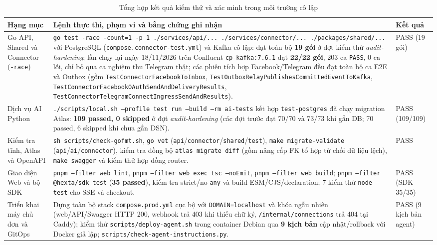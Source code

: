 \begin{table}[htbp]
  \centering
  \footnotesize
  \setlength{\tabcolsep}{4pt}
  \renewcommand{\arraystretch}{1.2}
  \caption{Tổng hợp kết quả kiểm thử và xác minh trong môi trường cô lập}\label{tab:eval-results}
  \begin{tabularx}{\linewidth}{@{}
    >{\raggedright\arraybackslash}p{2.9cm}
    >{\raggedright\arraybackslash}X
    >{\raggedright\arraybackslash}p{2.1cm}@{}}
    \toprule
    Hạng mục & Lệnh thực thi, phạm vi và bằng chứng ghi nhận & Kết quả \\
    \midrule
    Go API, Shared và Connector (\texttt{-race}) &
    \texttt{go test -race -count=1 -p 1 ./services/api/... ./services/connector/... ./packages/shared/...} với PostgreSQL (\texttt{compose.connector-test.yml}) và Kafka cô lập: đạt toàn bộ \textbf{19 gói} ở đợt kiểm thử \textit{audit-hardening}; lần chạy lại ngày 18/11/2026 trên Confluent \texttt{cp-\hspace{0pt}kafka:\hspace{0pt}7.6.1} đạt \textbf{22/22 gói}, 203 ca \texttt{PASS}, 0 ca lỗi, chỉ bỏ qua ca nghiệm thu Telegram thật; các phiên tích hợp Facebook/Telegram đều đạt toàn bộ ca E2E và Outbox (gồm \texttt{TestConnectorFacebookToInbox}, \texttt{TestOutboxRelayPublishesCommittedEventToKafka}, \texttt{TestConnectorFacebookOAuthSendAndDeliveryResults}, \texttt{TestConnectorTelegramConnectIngressSendAndResults}). &
    PASS (19 gói) \\
    Dịch vụ AI Python &
    \texttt{./scripts/local.sh --profile test run --build --rm ai-tests} kết hợp \texttt{test-postgres} đã chạy migration Atlas: \textbf{109 passed, 0 skipped} ở đợt \textit{audit-hardening} (các đợt trước đạt 70/70 và 73/73 khi gắn DB; 70 passed, 6 skipped khi chưa gắn DSN). &
    PASS (109/109) \\
    Kiểm tra tĩnh, Atlas và OpenAPI &
    \texttt{sh scripts/check-gofmt.sh}, \texttt{go vet} (\texttt{api}/\texttt{connector}/\texttt{shared}/\texttt{test}), \texttt{make migrate-validate} (\texttt{api}/\texttt{ai}/\texttt{connector}), kiểm tra đồng bộ \texttt{atlas migrate diff} (gồm nâng cấp FK tổ hợp từ chối dữ liệu lệch), \texttt{make swagger} và kiểm thử hợp đồng router. &
    PASS \\
    Giao diện Web và bộ SDK &
    \texttt{pnpm --filter web lint}, \texttt{pnpm --filter web exec tsc --noEmit}, \texttt{pnpm --filter web build}; \texttt{pnpm --filter @hexta/sdk test} (\textbf{35 passed}), kiểm tra strict/no-\texttt{any} và build ESM/CJS/declaration; 7 kiểm thử \texttt{node --test} cho SSE và checkout. &
    PASS (SDK 35/35) \\
    Triển khai máy chủ đơn và GitOps &
    Dựng toàn bộ stack \texttt{compose.prod.yml} cục bộ với \texttt{DOMAIN=localhost} và khóa ngẫu nhiên (web/API/Swagger HTTP 200, webhook trả 403 khi thiếu chữ ký,
    \texttt{/internal/connections} trả 404 tại Caddy); kiểm thử \texttt{scripts/deploy-agent.sh} trong container Debian qua \textbf{9 kịch bản} cập nhật/rollback với Docker
    giả lập; \texttt{scripts/check-agent-instructions.py}. &
    PASS (9 kịch bản agent) \\
    \bottomrule
  \end{tabularx}
\end{table}

